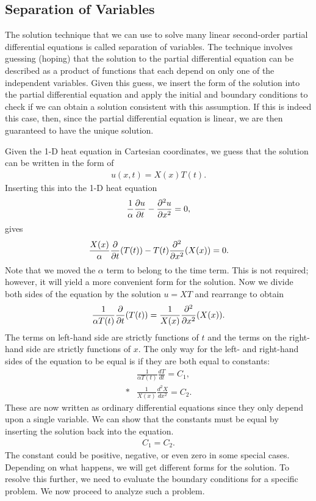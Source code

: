 \subsection{Separation of Variables}

The solution technique that we can use to solve many linear second-order partial differential equations is called separation of variables. The technique involves guessing (hoping) that the solution to the partial differential equation can be described as a product of functions that each depend on only one of the independent variables. Given this guess, we insert the form of the solution into the partial differential equation and apply the initial and boundary conditions to check if we can obtain a solution consistent with this assumption. If this is indeed this case, then, since the partial differential equation is linear, we are then guaranteed to have the unique solution.

Given the 1-D heat equation in Cartesian coordinates, we guess that the solution can be written in the form of
\begin{align}
  u(x,t) = X(x) T(t) .
\end{align}
Inserting this into the 1-D heat equation
\begin{align}
  \frac{1}{\alpha} \frac{ \partial {u} }{ \partial {t} } - \frac{ \partial^2 {u} }{ \partial {x}^2 } = 0, \nonumber
\end{align}
gives
\begin{align}
  \frac{X(x)}{\alpha} \frac{ \partial {} }{ \partial {t} }(  T(t) ) - T(t) \frac{ \partial^2 {} }{ \partial {x}^2 } ( X(x) ) = 0 .
\end{align}
Note that we moved the $\alpha$ term to belong to the time term. This is not required; however, it will yield a more convenient form for the solution. Now we divide both sides of the equation by the solution $u = XT$ and rearrange to obtain
\begin{align}
  \frac{1}{\alpha T(t)} \frac{ \partial {} }{ \partial {t} }(T(t)) = \frac{ 1 }{ X(x) } \frac{ \partial^2 {} }{ \partial {x}^2 } ( X(x) ) .
\end{align}
The terms on left-hand side are strictly functions of $t$ and the terms on the right-hand side are strictly functions of $x$. The only way for the left- and right-hand sides of the equation to be equal is if they are both equal to constants:
\begin{subequations}
\begin{align}
  &\frac{1}{\alpha T(t)} \frac{dT}{dt} = C_1 , \\*
  &\frac{1}{X(x)} \frac{d^2 X}{dx^2} = C_2 .
\end{align}
\end{subequations}
These are now written as ordinary differential equations since they only depend upon a single variable. We can show that the constants must be equal by inserting the solution back into the equation.
\begin{align}
  C_1 = C_2 .
\end{align}
The constant could be positive, negative, or even zero in some special cases. Depending on what happens, we will get different forms for the solution. To resolve this further, we need to evaluate the boundary conditions for a specific problem. We now proceed to analyze such a problem.


